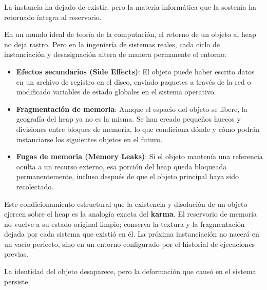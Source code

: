 La instancia ha dejado de existir, pero la materia informática que la sostenía ha retornado íntegra al reservorio.


\noindent En un mundo ideal de teoría de la computación, el retorno de un objeto al heap no deja rastro. Pero en la ingeniería de sistemas reales, cada ciclo de instanciación y desasignación altera de manera permanente el entorno:

\begin{itemize}
\item \textbf{Efectos secundarios (Side Effects)}: El objeto puede haber escrito datos en un archivo de registro en el disco, enviado paquetes a través de la red o modificado variables de estado globales en el sistema operativo.
\item \textbf{Fragmentación de memoria}: Aunque el espacio del objeto se libere, la geografía del heap ya no es la misma. Se han creado pequeños huecos y divisiones entre bloques de memoria, lo que condiciona dónde y cómo podrán instanciarse los siguientes objetos en el futuro.
\item \textbf{Fugas de memoria (Memory Leaks)}: Si el objeto mantenía una referencia oculta a un recurso externo, esa porción del heap queda bloqueada permanentemente, incluso después de que el objeto principal haya sido recolectado.
\end{itemize}

Este condicionamiento estructural que la existencia y disolución de un objeto ejercen sobre el heap es la analogía exacta del \textbf{karma}. El reservorio de memoria no vuelve a su estado original limpio; conserva la textura y la fragmentación dejada por cada sistema que existió en él. La próxima instanciación no nacerá en un vacío perfecto, sino en un entorno configurado por el historial de ejecuciones previas.

La identidad del objeto desaparece, pero la deformación que causó en el sistema persiste.

